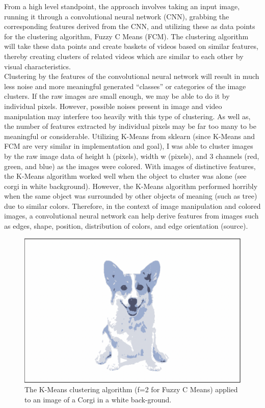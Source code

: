 \documentclass[10pt,twocolumn]{article}
\begin{document}
\indent From a high level standpoint, the approach involves taking an input image, running it through a convolutional neural network (CNN), grabbing the corresponding features derived from the CNN, and utilizing these as data points for the clustering algorithm, Fuzzy C Means (FCM). The clustering algorithm will take these data points and create baskets of videos based on similar features, thereby creating clusters of related videos which are similar to each other by visual characteristics. 
\\
\indent 
Clustering by the features of the convolutional neural network will result in much less noise and more meaningful generated “classes” or categories of the image clusters. If the raw images are small enough, we may be able to do it by individual pixels. However, possible noises present in image and video manipulation may interfere too heavily with this type of clustering. As well as, the number of features extracted by individual pixels may be far too many to be meaningful or considerable. Utilizing K-Means from sklearn (since K-Means and FCM are very similar in implementation and goal), I was able to cluster images by the raw image data of height h (pixels), width w (pixels), and 3 channels (red, green, and blue) as the images were colored. With images of distinctive features, the K-Means algorithm worked well when the object to cluster was alone (see corgi in white background). However, the K-Means algorithm performed horribly when the same object was surrounded by other objects of meaning (such as tree) due to similar colors. Therefore, in the context of image manipulation and colored images, a convolutional neural network can help derive features from images such as edges, shape, position, distribution of colors, and edge orientation (source).

\begin{figure}[h]
  \centering
  \includegraphics[scale=0.2]{corgi-white.png}
  \vspace{20px}
  \caption{The K-Means clustering algorithm (f=2 for Fuzzy C Means) applied to an image of a Corgi in a white back-ground.}
  \label{corgi:white}
\end{figure}
\end{document}
